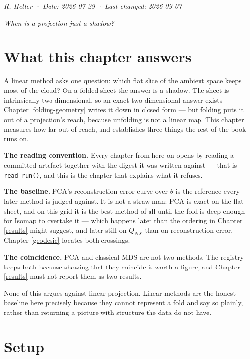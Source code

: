 \documentclass[
  british,
  a4paper,
]{book}
\begin{document}
\emph{R. Heller · Date: 2026-07-29 · Last changed: 2026-09-07}

\emph{When is a projection just a shadow?}

\section{What this chapter answers}\label{lin-question}

A linear method asks one question: which flat slice of the ambient space keeps
most of the cloud? On a folded sheet the answer is a shadow. The sheet is
intrinsically two-dimensional, so an exact two-dimensional answer exists ---
Chapter \ref{folding-geometry} writes it down in closed form --- but folding puts
it out of a projection's reach, because unfolding is not a linear map. This
chapter measures how far out of reach, and establishes three things the rest of
the book runs on.

\textbf{The reading convention.} Every chapter from here on opens by reading a
committed artefact together with the digest it was written against --- that is
\texttt{read\_run()}, and this is the chapter that explains what it refuses.

\textbf{The baseline.} PCA's reconstruction-error curve over \(\theta\) is the reference
every later method is judged against. It is not a straw man: PCA is exact on the
flat sheet, and on this grid it is the best method of all until the fold is deep
enough for Isomap to overtake it --- which happens later than the ordering in
Chapter \ref{results} might suggest, and later still on \(Q_{NX}\) than on
reconstruction error. Chapter \ref{geodesic} locates both crossings.

\textbf{The coincidence.} PCA and classical MDS are not two methods. The registry
keeps both because showing that they coincide is worth a figure, and Chapter
\ref{results} must not report them as two results.

None of this argues against linear projection. Linear methods are the honest
baseline here precisely because they cannot represent a fold and say so plainly,
rather than returning a picture with structure the data do not have.

\section{Setup}\label{lin-setup}
\end{document}
